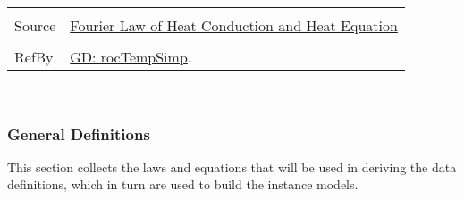 \documentclass[12pt]{article}
\begin{document}
\begin{minipage}{\textwidth}
\begin{tabular}{p{} p{}}
                                         \\ \midrule \\
                                         Source & \hyperref[http://www.efunda.com/formulae/heat_transfer/conduction/overview_cond.cfm]{Fourier Law of Heat Conduction and Heat Equation}
                                                  \\ \midrule \\
                                                  RefBy & \hyperref[GD:rocTempSimp]{GD: rocTempSimp}.
\\ \bottomrule \end{tabular}
\end{minipage}\\
\subsubsection{General Definitions}
\label{Sec:GDs}
This section collects the laws and equations that will be used in deriving the data definitions, which in turn are used to build the instance models.
~\newline
\end{document}
